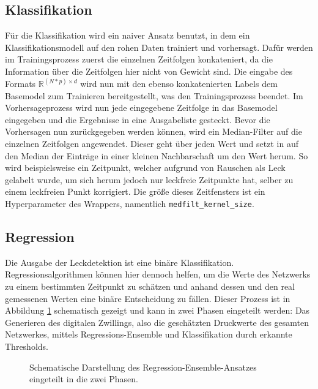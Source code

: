 \subsection*{Klassifikation}

Für die Klassifikation wird ein naiver Ansatz benutzt, in dem ein Klassifikationsmodell auf den rohen Daten
 trainiert und vorhersagt. Dafür werden im Trainingsprozess zuerst die einzelnen Zeitfolgen konkateniert, da
 die Information über die Zeitfolgen hier nicht von Gewicht sind. Die eingabe des Formats
 $\mathbb{R}^{(N*p) \times d}$ wird nun mit den ebenso konkatenierten Labels dem Basemodel zum Trainieren
 bereitgestellt, was den Trainingsprozess beendet. Im Vorhersageprozess wird nun jede eingegebene Zeitfolge
 in das Basemodel eingegeben und die Ergebnisse in eine Ausgabeliste gesteckt. Bevor die Vorhersagen nun
 zurückgegeben werden können, wird ein Median-Filter auf die einzelnen Zeitfolgen angewendet. Dieser geht
 über jeden Wert und setzt in auf den Median der Einträge in einer kleinen Nachbarschaft um den Wert herum.
 So wird beispielsweise ein Zeitpunkt, welcher aufgrund von Rauschen als Leck gelabelt wurde, um sich herum
 jedoch nur leckfreie Zeitpunkte hat, selber zu einem leckfreien Punkt korrigiert. Die größe dieses Zeitfensters
 ist ein Hyperparameter des Wrappers, namentlich \texttt{medfilt\_kernel\_size}.

\subsection*{Regression}

Die Ausgabe der Leckdetektion ist eine binäre Klassifikation. Regressionsalgorithmen können hier dennoch helfen,
 um die Werte des Netzwerks zu einem bestimmten Zeitpunkt zu schätzen und anhand dessen und den real gemessenen
 Werten eine binäre Entscheidung zu fällen. Dieser Prozess ist in Abbildung \ref{fig:practice-ensemble} schematisch
 gezeigt und kann in zwei Phasen eingeteilt werden: Das Generieren des digitalen Zwillings, also die geschätzten
 Druckwerte des gesamten Netzwerkes, mittels Regressions-Ensemble und Klassifikation durch erkannte Thresholds.

\begin{figure}
    \centering
    \caption{Schematische Darstellung des Regression-Ensemble-Ansatzes eingeteilt in die zwei Phasen.}
    \label{fig:practice-ensemble}
\end{figure}

